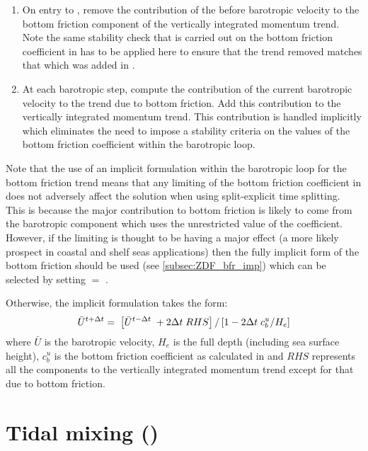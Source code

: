 \documentclass[../main/NEMO_manual]{subfiles}
\begin{document}
\begin{enumerate}
\item On entry to , remove the contribution of the before barotropic velocity to
  the bottom friction component of the vertically integrated momentum trend.
  Note the same stability check that is carried out on the bottom friction coefficient in  has to
  be applied here to ensure that the trend removed matches that which was added in .
\item At each barotropic step, compute the contribution of the current barotropic velocity to
  the trend due to bottom friction.
  Add this contribution to the vertically integrated momentum trend.
  This contribution is handled implicitly which eliminates the need to impose a stability criteria on
  the values of the bottom friction coefficient within the barotropic loop. 
\end{enumerate}

Note that the use of an implicit formulation within the barotropic loop for the bottom friction trend means that
any limiting of the bottom friction coefficient in  does not adversely affect the solution when
using split-explicit time splitting.
This is because the major contribution to bottom friction is likely to come from the barotropic component which
uses the unrestricted value of the coefficient.
However, if the limiting is thought to be having a major effect
(a more likely prospect in coastal and shelf seas applications) then
the fully implicit form of the bottom friction should be used (see \autoref{subsec:ZDF_bfr_imp})
which can be selected by setting  $=$ .

Otherwise, the implicit formulation takes the form:
\[
  \bar{U}^{t+ \Delta t} = \; \left [ \bar{U}^{t-\Delta t}\; + 2 \Delta t\;RHS \right ] / \left [ 1 - 2 \Delta t \;c_b^{u} / H_e \right ]
\]
where $\bar U$ is the barotropic velocity, $H_e$ is the full depth (including sea surface height), 
$c_b^u$ is the bottom friction coefficient as calculated in  and
$RHS$ represents all the components to the vertically integrated momentum trend except for
that due to bottom friction.

\section{Tidal mixing (\protect{})}
\label{sec:ZDF_tmx}
\end{document}
